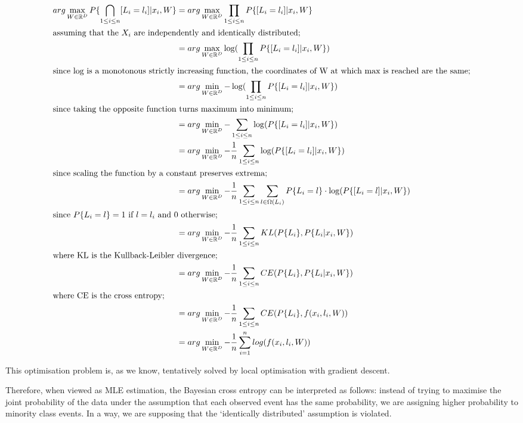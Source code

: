 \documentclass[a4paper,11pt]{article}
\begin{document}
\begin{align*}
arg\max\limits_{W \in \mathbb{R}^D} P\{\bigcap \limits_{1 \leq i \leq n} [L_i = l_i]|x_i,W\}
&= arg\max\limits_{W \in \mathbb{R}^D} \prod\limits_{1 \leq i \leq n} P\{[L_i = l_i]|x_i,W\}\\ 
\intertext{assuming that the $X_i$ are independently and identically distributed;}
&= arg\max\limits_{W \in \mathbb{R}^D} \log(\prod\limits_{1 \leq i \leq n} P\{[L_i = l_i]|x_i,W\})\\ 
\intertext{since log is a monotonous strictly increasing function, the coordinates of W at which max is reached are the same;}
&= arg\min\limits_{W \in \mathbb{R}^D} -\log(\prod\limits_{1 \leq i \leq n} P\{[L_i = l_i]|x_i,W\})\\ 
\intertext{since taking the opposite function turns maximum into minimum;}
&= arg\min\limits_{W \in \mathbb{R}^D} -\sum\limits_{1 \leq i \leq n} \log(P\{[L_i = l_i]|x_i,W\})\\
&= arg\min\limits_{W \in \mathbb{R}^D} -\frac{1}{n} \sum\limits_{1 \leq i \leq n} \log(P\{[L_i = l_i]|x_i,W\})\\ \intertext{since scaling the function by a constant preserves extrema;}
&= arg\min\limits_{W \in \mathbb{R}^D} -\frac{1}{n} \sum\limits_{1 \leq i \leq n} \sum\limits_{l \in \Omega(L_i)} P\{L_i = l\} \cdot \log(P\{[L_i = l]|x_i,W\})\\ 
\intertext{since $P\{L_i = l\} = 1$ if $l = l_i$ and 0 otherwise;}
&= arg\min\limits_{W \in \mathbb{R}^D} -\frac{1}{n} \sum\limits_{1 \leq i \leq n} KL(P\{L_i\},P\{L_i|x_i,W\})\\ \intertext{where KL is the Kullback-Leibler divergence;}
&= arg\min\limits_{W \in \mathbb{R}^D} -\frac{1}{n} \sum\limits_{1 \leq i \leq n} CE(P\{L_i\},P\{L_i|x_i,W\})\\ \intertext{where CE is the cross entropy;}
&= arg\min\limits_{W \in \mathbb{R}^D} -\frac{1}{n} \sum\limits_{1 \leq i \leq n} CE(P\{L_i\},f(x_i,l_i,W))\\ 
&= arg\min\limits_{W \in \mathbb{R}^D} -\frac{1}{n}\sum\limits_{i=1}^{n} log(f(x_i,l_i,W))
\end{align*}

This optimisation problem is, as we know, tentatively solved by local optimisation with gradient descent.

Therefore, when viewed as MLE estimation, the Bayesian cross entropy can be interpreted as follows: instead of trying to maximise the joint probability of the data under the assumption that each observed event has the same probability, we are assigning higher probability to minority class events. In a way, we are supposing that the `identically distributed' assumption is violated.
\end{document}
